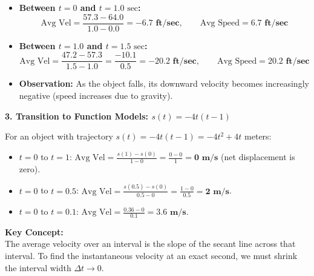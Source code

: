 \documentclass[10.5pt]{article}
\begin{document}
\begin{itemize}[leftmargin=1.2em, topsep=1pt, itemsep=3pt]
  \item \textbf{Between $t = 0$ and $t = 1.0\text{ sec}$:}
  \[
    \text{Avg Vel} = \frac{57.3 - 64.0}{1.0 - 0.0} = \mathbf{-6.7\text{ ft/sec}}, \qquad \text{Avg Speed} = \mathbf{6.7\text{ ft/sec}}
  \]
  \item \textbf{Between $t = 1.0$ and $t = 1.5\text{ sec}$:}
  \[
    \text{Avg Vel} = \frac{47.2 - 57.3}{1.5 - 1.0} = \frac{-10.1}{0.5} = \mathbf{-20.2\text{ ft/sec}}, \qquad \text{Avg Speed} = \mathbf{20.2\text{ ft/sec}}
  \]
  \item \textbf{Observation:} As the object falls, its downward velocity becomes increasingly negative (speed increases due to gravity).
\end{itemize}

\vspace{0.04in}

\textbf{\large 3. Transition to Function Models: $s(t) = -4t(t-1)$}

For an object with trajectory $s(t) = -4t(t-1) = -4t^2 + 4t$ meters:
\begin{itemize}[leftmargin=1.2em, topsep=1pt, itemsep=3pt]
  \item $t = 0$ to $t = 1$: $\text{Avg Vel} = \frac{s(1) - s(0)}{1 - 0} = \frac{0 - 0}{1} = \mathbf{0\text{ m/s}}$ (net displacement is zero).
  \item $t = 0$ to $t = 0.5$: $\text{Avg Vel} = \frac{s(0.5) - s(0)}{0.5 - 0} = \frac{1 - 0}{0.5} = \mathbf{2\text{ m/s}}$.
  \item $t = 0$ to $t = 0.1$: $\text{Avg Vel} = \frac{0.36 - 0}{0.1} = \mathbf{3.6\text{ m/s}}$.
\end{itemize}

\vspace{0.03in}

\begin{tcolorbox}[colback=chalkblue!6, colframe=chalkblue, boxrule=1pt, arc=3pt, left=8pt, right=8pt, top=4pt, bottom=4pt]
\textbf{Key Concept:}\\[1pt]
The average velocity over an interval is the slope of the secant line across that interval. To find the instantaneous velocity at an exact second, we must shrink the interval width $\Delta t \to 0$.
\end{tcolorbox}
\end{document}
